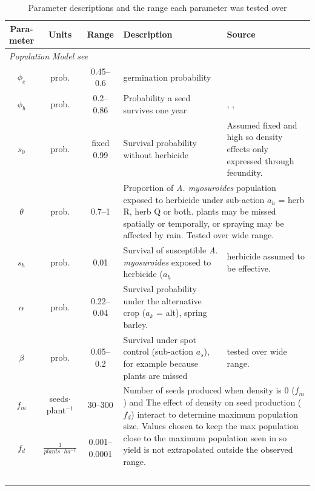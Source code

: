 \documentclass[12pt, a4paper]{article}
\begin{document}
\newpage 

\begin{longtable}{c c c p{5cm} p{4cm}}
	\caption{Parameter descriptions and the range each parameter was tested over}
	\label{tab:pars}
	\\
	\hline
	\makecell{\textbf{Para-}\\\textbf{meter}} & \textbf{Units} & \textbf{Range} & \textbf{Description} & \textbf{Source} \\
	\hline
	\endhead
	\multicolumn{5}{l}{\textit{Population Model  see \nameref{app:pop_model}}}\\
	$\phi_e$ & prob. & 0.45--0.6 & germination probability & \citet{Colb2006} \\ 
	$\phi_b$ & prob. & 0.2--0.86 & Probability a seed survives one year & \citet{Colb2006}, \citet{Thom1997}, \citet{Cava1999}\\
	$s_0$ & prob. & fixed 0.99 & Survival probability without herbicide & Assumed fixed and high so density effects only expressed through fecundity.\\
	$\theta$ & prob. & 0.7--1 & \multicolumn{2}{l}{\parbox[t]{9cm}{Proportion of \textit{A. myosuroides} population exposed to herbicide under sub-action $a_h$ = herb R, herb Q or both. plants may be missed spatially or temporally, or spraying may be affected by rain. Tested over wide range.}} \\       
	$s_h$ & prob. & 0.01 & Survival of susceptible \textit{A. myosuroides} exposed to herbicide ($a_h$ & herbicide assumed to be effective.\\
	$\alpha$ & prob. & 0.22--0.04 & Survival probability under the alternative crop ($a_k$ = alt), spring barley. & \citet{Lutm2013}\\
	$\beta$ & prob. & 0.05--0.2 & Survival under spot control (sub-action $a_s$), for example because plants are missed & tested over wide range.\\
	$f_m$ & \makecell[t]{seeds$\cdot$\\plant$^{-1}$} & 30--300 & \multicolumn{2}{l}{\multirow{2}{9cm}{\parbox[t]{9cm}{Number of seeds produced when density is 0 ($f_m$) and The effect of density on seed production ($f_d$) interact to determine maximum population size. Values chosen to keep the max population close to the maximum population seen in \citet{Quee2011} so yield is not extrapolated outside the observed range.}}} \\
	$f_d$ & $\frac{1}{plants\cdot ha^{-1}}$ & 0.001--0.0001 &  \\\\\\\\\\\\

\end{longtable}
\end{document}
